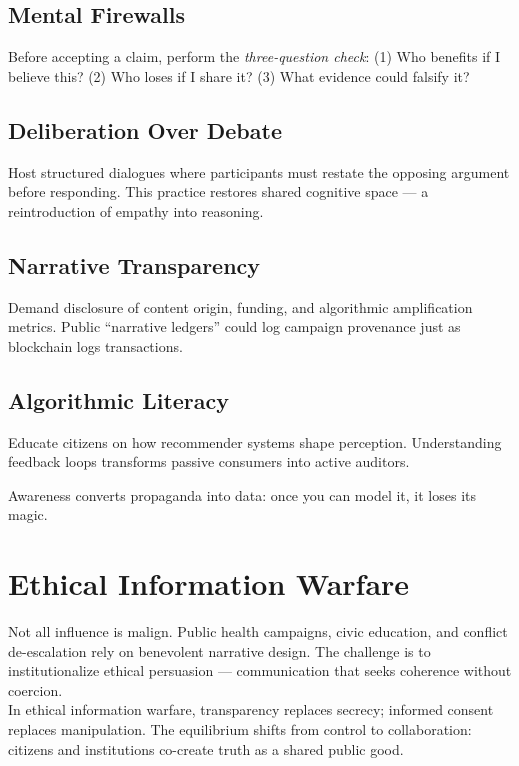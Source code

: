 \documentclass[12pt,twoside]{book}
\begin{document}
\subsection*{Mental Firewalls}
Before accepting a claim, perform the \emph{three-question check}:  
(1) Who benefits if I believe this?  
(2) Who loses if I share it?  
(3) What evidence could falsify it?

\subsection*{Deliberation Over Debate}
Host structured dialogues where participants must restate the opposing argument before
responding.
This practice restores shared cognitive space — a reintroduction of empathy into reasoning.

\subsection*{Narrative Transparency}
Demand disclosure of content origin, funding, and algorithmic amplification metrics.  
Public “narrative ledgers” could log campaign provenance just as blockchain logs transactions.

\subsection*{Algorithmic Literacy}
Educate citizens on how recommender systems shape perception.
Understanding feedback loops transforms passive consumers into active auditors.\\

\begin{keyidea}
Awareness converts propaganda into data: once you can model it, it loses its magic.
\end{keyidea}

\section{Ethical Information Warfare}

Not all influence is malign.
Public health campaigns, civic education, and conflict de-escalation rely on benevolent narrative design.
The challenge is to institutionalize ethical persuasion — communication that seeks coherence without coercion.\\

In ethical information warfare, transparency replaces secrecy; informed consent replaces
manipulation.
The equilibrium shifts from control to collaboration: citizens and institutions co-create truth as a shared public good.\\
\end{document}
